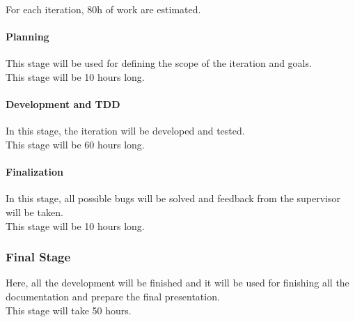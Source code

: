 For each iteration, 80h of work are estimated.
\paragraph{Planning\\}
This stage will be used for defining the scope of the iteration and goals.\\

This stage will be 10 hours long.
\paragraph{Development and TDD\\}
In this stage, the iteration will be developed and tested.\\

This stage will be 60 hours long.
\paragraph{Finalization\\}
In this stage, all possible bugs will be solved and feedback from the supervisor will be taken.\\

This stage will be 10 hours long.


\subsubsection{Final Stage}
Here, all the development will be finished and it will be used for finishing all the documentation and prepare the final presentation.\\

This stage will take 50 hours.

